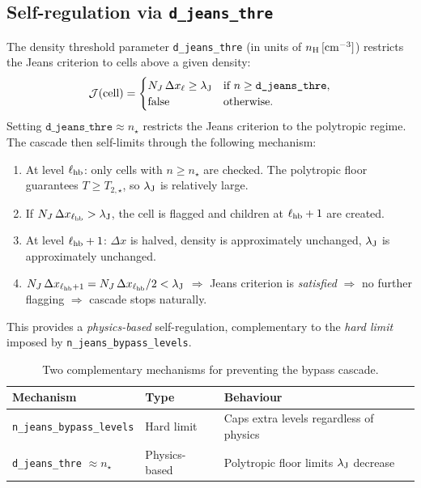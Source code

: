 \documentclass[fleqn,usenatbib]{mnras}
\newcommand{\lJ}{\lambda_{\rm J}}
\newcommand{\nstar}{n_\star}
\newcommand{\Tstar}{T_{2,\star}}
\newcommand{\dx}{\Delta x}
\newcommand{\code}[1]{\texttt{#1}}
\begin{document}
\subsection{Self-regulation via \code{d\_jeans\_thre}}

The density threshold parameter \code{d\_jeans\_thre} (in units of
$n_{\rm H}\,[{\rm cm}^{-3}]$) restricts the Jeans criterion to cells
above a given density:
\begin{equation}
  \mathcal{J}(\text{cell}) =
  \begin{cases}
    N_J\,\dx_\ell \ge \lJ & \text{if } n \ge
    \code{d\_jeans\_thre}, \\
    \text{false} & \text{otherwise}.
  \end{cases}
\end{equation}
Setting $\code{d\_jeans\_thre} \approx \nstar$ restricts the Jeans
criterion to the polytropic regime.  The cascade then self-limits
through the following mechanism:

\begin{enumerate}
  \item At level $\ell_{\rm hb}$: only cells with $n \ge \nstar$ are
    checked.  The polytropic floor guarantees $T \ge \Tstar$, so $\lJ$
    is relatively large.
  \item If $N_J\,\dx_{\ell_{\rm hb}} > \lJ$, the cell is flagged and
    children at $\ell_{\rm hb}+1$ are created.
  \item At level $\ell_{\rm hb}+1$: $\dx$ is halved, density is
    approximately unchanged, $\lJ$ is approximately unchanged.
  \item $N_J\,\dx_{\ell_{\rm hb}+1} = N_J\,\dx_{\ell_{\rm hb}}/2
    < \lJ$ $\Rightarrow$ Jeans criterion is \emph{satisfied}
    $\Rightarrow$ no further flagging $\Rightarrow$ cascade stops
    naturally.
\end{enumerate}

This provides a \emph{physics-based} self-regulation, complementary to
the \emph{hard limit} imposed by \code{n\_jeans\_bypass\_levels}.

\begin{table}
\centering
\caption{Two complementary mechanisms for preventing the bypass
cascade.}
\label{tab:regulators}
\begin{tabular}{lll}
\toprule
Mechanism & Type & Behaviour \\
\midrule
\code{n\_jeans\_bypass\_levels} & Hard limit &
  Caps extra levels regardless of physics \\
\code{d\_jeans\_thre} $\approx \nstar$ & Physics-based &
  Polytropic floor limits $\lJ$ decrease \\
\bottomrule
\end{tabular}
\end{table}
\end{document}
